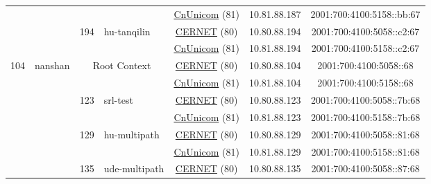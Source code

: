 \begin{small}
\begin{center}
\begin{longtable}{|c|c|c|c|c|c|c|c|}
  &  &  &  & \multicolumn{2}{|c|}{\tiny{\href{http://www.chinaunicom.com}{CnUnicom} (81)}} & \tiny{10.81.88.187} & \tiny{2001:700:4100:5158::bb:67} \\* \cline{3-3}\cline{4-4}\cline{5-5}\cline{6-6}\cline{7-7}\cline{8-8}
  &  & \multirow{2}{*}{\tiny{194}} & \multicolumn{1}{|l|}{\multirow{2}{*}{\tiny{hu-tanqilin}}} & \multicolumn{2}{|c|}{\tiny{\href{http://www.cernet.edu.cn}{CERNET} (80)}} & \tiny{10.80.88.194} & \tiny{2001:700:4100:5058::c2:67} \\* \cline{5-5}\cline{6-6}\cline{7-7}\cline{8-8}
  &  &  &  & \multicolumn{2}{|c|}{\tiny{\href{http://www.chinaunicom.com}{CnUnicom} (81)}} & \tiny{10.81.88.194} & \tiny{2001:700:4100:5158::c2:67} \\ \hline
 \multirow{32}{*}{\tiny{104}} & \multicolumn{1}{|l|}{\multirow{32}{*}{\tiny{nanshan}}} & \multicolumn{2}{|c|}{\multirow{2}{*}{\tiny{Root Context}}} & \multicolumn{2}{|c|}{\tiny{\href{http://www.cernet.edu.cn}{CERNET} (80)}} & \tiny{10.80.88.104} & \tiny{2001:700:4100:5058::68} \\* \cline{5-5}\cline{6-6}\cline{7-7}\cline{8-8}
  &  & \multicolumn{2}{|c|}{} & \multicolumn{2}{|c|}{\tiny{\href{http://www.chinaunicom.com}{CnUnicom} (81)}} & \tiny{10.81.88.104} & \tiny{2001:700:4100:5158::68} \\* \cline{3-3}\cline{4-4}\cline{5-5}\cline{6-6}\cline{7-7}\cline{8-8}
  &  & \multirow{2}{*}{\tiny{123}} & \multicolumn{1}{|l|}{\multirow{2}{*}{\tiny{srl-test}}} & \multicolumn{2}{|c|}{\tiny{\href{http://www.cernet.edu.cn}{CERNET} (80)}} & \tiny{10.80.88.123} & \tiny{2001:700:4100:5058::7b:68} \\* \cline{5-5}\cline{6-6}\cline{7-7}\cline{8-8}
  &  &  &  & \multicolumn{2}{|c|}{\tiny{\href{http://www.chinaunicom.com}{CnUnicom} (81)}} & \tiny{10.81.88.123} & \tiny{2001:700:4100:5158::7b:68} \\* \cline{3-3}\cline{4-4}\cline{5-5}\cline{6-6}\cline{7-7}\cline{8-8}
  &  & \multirow{2}{*}{\tiny{129}} & \multicolumn{1}{|l|}{\multirow{2}{*}{\tiny{hu-multipath}}} & \multicolumn{2}{|c|}{\tiny{\href{http://www.cernet.edu.cn}{CERNET} (80)}} & \tiny{10.80.88.129} & \tiny{2001:700:4100:5058::81:68} \\* \cline{5-5}\cline{6-6}\cline{7-7}\cline{8-8}
  &  &  &  & \multicolumn{2}{|c|}{\tiny{\href{http://www.chinaunicom.com}{CnUnicom} (81)}} & \tiny{10.81.88.129} & \tiny{2001:700:4100:5158::81:68} \\* \cline{3-3}\cline{4-4}\cline{5-5}\cline{6-6}\cline{7-7}\cline{8-8}
  &  & \multirow{2}{*}{\tiny{135}} & \multicolumn{1}{|l|}{\multirow{2}{*}{\tiny{ude-multipath}}} & \multicolumn{2}{|c|}{\tiny{\href{http://www.cernet.edu.cn}{CERNET} (80)}} & \tiny{10.80.88.135} & \tiny{2001:700:4100:5058::87:68} \\* \cline{5-5}\cline{6-6}\cline{7-7}\cline{8-8}

\end{longtable}
\end{center}
\end{small}

